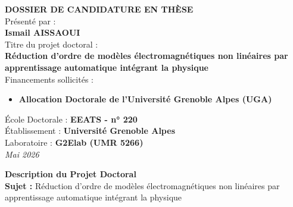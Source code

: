 \documentclass[a4paper,11pt]{article}
\begin{document}
\begin{titlepage}
    \begin{center}
        \vspace*{2cm}
        {\Huge\bfseries\color{ugagreen} DOSSIER DE CANDIDATURE EN THÈSE}\\[2cm]
        
        {\Large Présenté par :}\\[0.5cm]
        {\huge\bfseries Ismail AISSAOUI}\\[2cm]
        
        {\Large Titre du projet doctoral :}\\[0.5cm]
        {\Large\bfseries Réduction d’ordre de modèles électromagnétiques non linéaires par apprentissage automatique intégrant la physique}\\[2cm]
        
        {\Large Financements sollicités :}\\[0.5cm]
        \begin{itemize}[label=--]
            \item[] \textbf{Allocation Doctorale de l'Université Grenoble Alpes (UGA)}
        \end{itemize}

        \vfill
        
        {\Large École Doctorale : \textbf{EEATS - n° 220}}\\[0.3cm]
        {\Large Établissement : \textbf{Université Grenoble Alpes}}\\[0.3cm]
        {\Large Laboratoire : \textbf{G2Elab (UMR 5266)}}\\[2cm]
        
        \textit{Mai 2026}
    \end{center}
\end{titlepage}

\newpage

\begin{center}
    {\Large\bfseries Description du Projet Doctoral}\\[10pt]
    \textbf{Sujet :} Réduction d’ordre de modèles électromagnétiques non linéaires par apprentissage automatique intégrant la physique
\end{center}
\end{document}
